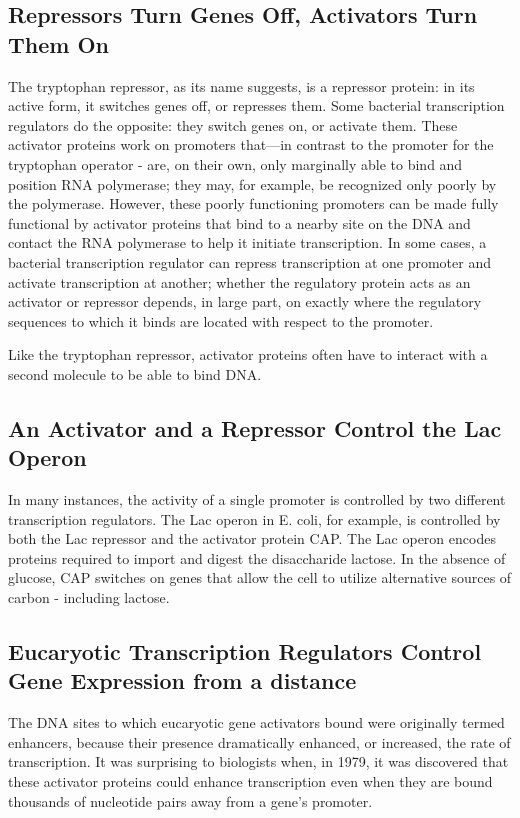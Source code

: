 \subsection{Repressors Turn Genes Off, Activators Turn Them On}

The tryptophan repressor, as its name suggests, is a repressor protein:
in its active form, it switches genes off, or represses them. Some bacterial
transcription regulators do the opposite: they switch genes on, or activate
them. These activator proteins work on promoters that—in contrast to
the promoter for the tryptophan operator - are, on their own, only marginally 
able to bind and position RNA polymerase; they may, for example,
be recognized only poorly by the polymerase. However, these poorly
functioning promoters can be made fully functional by activator proteins
that bind to a nearby site on the DNA and contact the RNA polymerase to
help it initiate transcription. In some cases, a bacterial transcription 
regulator can repress transcription at one promoter and activate
transcription at another; whether the regulatory protein acts as an activator 
or repressor depends, in large part, on exactly where the regulatory
sequences to which it binds are located with respect to the promoter.

Like the tryptophan repressor, activator proteins often have to interact
with a second molecule to be able to bind DNA.

\subsection{An Activator and a Repressor Control the Lac Operon}

In many instances, the activity of a single promoter is controlled by two
different transcription regulators. The Lac operon in E. coli, for example,
is controlled by both the Lac repressor and the activator protein CAP. The
Lac operon encodes proteins required to import and digest the disaccharide 
lactose. In the absence of glucose, CAP switches on genes that
allow the cell to utilize alternative sources of carbon - including lactose.

\subsection{Eucaryotic Transcription Regulators Control Gene Expression from a distance}

The DNA sites to which eucaryotic gene activators bound were originally termed enhancers,
because their presence dramatically enhanced, or increased, the rate of
transcription. It was surprising to biologists when, in 1979, it was discovered 
that these activator proteins could enhance transcription even when
they are bound thousands of nucleotide pairs away from a gene’s promoter.


